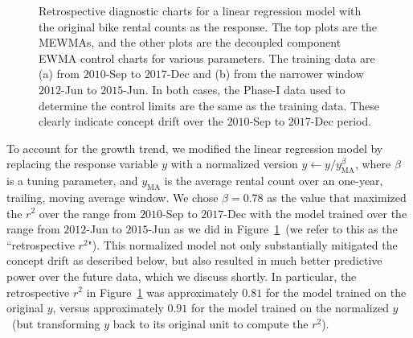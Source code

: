 \documentclass[twoside,11pt]{article}
\begin{document}
\begin{figure}[H]
\begin{subfigure}[t]{0.35\linewidth}
     \captionsetup{width=.95\linewidth}
     \caption{}
     \label{fig:bs_retro_narrow_train}
\end{subfigure}
\caption{Retrospective diagnostic charts for a linear regression model with the original bike rental counts as the response. The top plots are the MEWMAs, and the other plots are the decoupled component EWMA control charts for various parameters. The training data are (a) from $2010$-Sep to $2017$-Dec and (b) from the narrower window $2012$-Jun to $2015$-Jun. In both cases, the Phase-I data used to determine the control limits are the same as the training data. These clearly indicate concept drift over the $2010$-Sep to $2017$-Dec period.}
\label{fig:bike_sharing}
\end{figure}

To account for the growth trend, we modified the linear regression model by replacing the response variable $y$ with a normalized version  $y \leftarrow y/y_{\mathrm{MA}}^\beta$, where $\beta$ is a tuning parameter, and $y_{\mathrm{MA}}$ is the average rental count over an one-year, trailing, moving average window. We chose $\beta=0.78$ as the value that maximized the $r^2$ over the range from $2010$-Sep to $2017$-Dec with the model trained over the range from $2012$-Jun to $2015$-Jun as we did in Figure~\ref{fig:bs_retro_narrow_train}~(we refer to this as the ``retrospective $r^2$"). %
This normalized model not only substantially mitigated the concept drift as described below, but also resulted in much better predictive power over the future data, which we discuss shortly. In particular, the retrospective $r^2$ in Figure~\ref{fig:bs_retro_narrow_train} was approximately $0.81$ for the model trained on the original $y$, versus approximately $0.91$ for the model trained on the normalized $y$~(but transforming $y$ back to its original unit to compute the $r^2$). %
\end{document}
